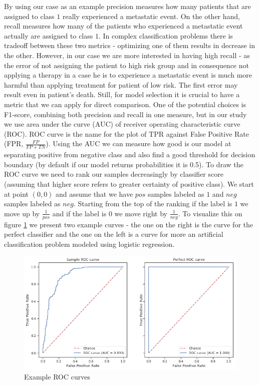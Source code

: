 \documentclass[shortabstract, english, mgr]{iithesis}
\begin{document}
By using our case as an example precision measures how many patients that are assigned to class $1$ really experienced a metastatic event. On the other hand, recall measures how many of the patients who experienced a metastatic event actually are assigned to class $1$. In complex classification problems there is tradeoff between these two metrics - optimizing one of them results in decrease in the other. However, in our case we are more interested in having high recall - as the error of not assigning the patient to high risk group and in consequence not applying a therapy in a case he is to experience a metastatic event is much more harmful than applying treatment for patient of low risk. The first error may result even in patient's death. Still, for model selection it is crucial to have a metric that we can apply for direct comparison. One of the potential choices is F1-score, combining both precision and recall in one measure, but in our study we use area under the curve (AUC) of receiver operating characteristic curve (ROC). ROC curve is the name for the plot of TPR against False Positive Rate (FPR, $\frac{FP}{FP + TN}$). Using the AUC we can measure how good is our model at separating positive from negative class and also find a good threshold for decision boundary (by default if our model returns probabilities it is 0.5). To draw the ROC curve we need to rank our samples decreasingly by classifier score (assuming that higher score refers to greater certainty of positive class). We start at point $(0,0)$ and assume that we have $pos$ samples labeled as $1$ and $neg$ samples labeled as $neg$. Starting from the top of the ranking if the label is $1$ we move up by $\frac{1}{pos}$ and if the label is $0$ we move right by $\frac{1}{neg}$. To visualize this on figure \ref{fig:roc} we present two example curves - the one on the right is the curve for the perfect classifier and the one on the left is a curve for more an artificial classification problem modeled using logistic regression.

\begin{figure}
\centering
\includegraphics[width=\textwidth]{images/rocExample.png}
\caption{Example ROC curves}
\label{fig:roc}
\end{figure}
\end{document}
